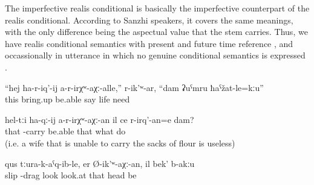 The imperfective realis conditional is basically the imperfective counterpart of the realis conditional. According to Sanzhi speakers, it covers the same meanings, with the only difference being the aspectual value that the stem carries. Thus, we have realis conditional semantics with present and future time reference ,  and occassionally in utterance in which no genuine conditional semantics is expressed . 
%
\begin{exe}
	\ex	\label{ex:If I cannot educate (up bring) her (myself), she said, then the life is of no need for me.}
	\gll	``hej	ha-r-iq'-ij	a-r-irχʷ-aχː-alle,''	r-ik'ʷ-ar,	``dam	ʡuˁmru	ħaˁžat-le=kːu''\\
		this	bring.up	be.able	say			life	need\\
	\glt	{}

	\ex	\label{ex:‎‎‎If she is not able to carry those (sacks), of what use is she for me?}
	\gll	hel-tːi	ha-qː-ij	a-r-irχʷ-aχː-an		il	ce	r-irq'-an=e	dam?\\
		that	-carry	be.able	that	what	do	\\
	\glt	{} (i.e. a wife that is unable to carry the sacks of flour is useless)

	\ex	\label{ex:After having pulled (him) out, if they look, there is not head}
	\gll	qus	tːura-k-aˁq-ib-le,	er	Ø-ik'ʷ-aχː-an,	il	bek'	b-akːu	\\
		slip	-drag	look	look.at	that		head	be\\
	\glt	{}
\end{exe}

